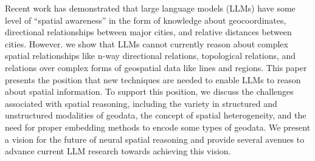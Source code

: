 
Recent work has demonstrated that large language models (LLMs) have some level of ``spatial awareness'' in the form of knowledge about geocoordinates, directional relationships between major cities, and relative distances between cities.
%
However. we show that LLMs cannot currently reason about complex spatial relationships like n-way directional relations, topological relations, and relations over complex forms of geospatial data like lines and regions.
%
This paper presents the position that new techniques are needed to enable LLMs to reason about spatial information.
%
To support this position, we discuss the challenges associated with spatial reasoning, including the variety in structured and unstructured modalities of geodata, the concept of spatial heterogeneity, and the need for proper embedding methods to encode some types of geodata.
%
We present a vision for the future of neural spatial reasoning and provide several avenues to advance current LLM research towards achieving this vision.